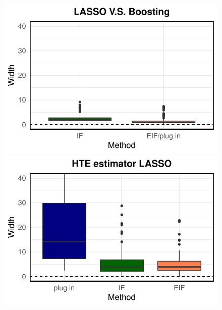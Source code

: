 \begin{figure}[ht]
\begin{minipage}{0.3\textwidth}
                \includegraphics[clip, trim = 0cm 0cm 0cm 0cm, width = \textwidth]{plot/ACIC_linear_propensity_linear_HTE_CI_width_LASSO_V.S._Boosting.pdf}
        \end{minipage}        
        \begin{minipage}{0.3\textwidth}
                \centering
                \includegraphics[clip, trim = 0cm 0cm 0cm 0cm, width = \textwidth]{plot/ACIC_linear_propensity_nonlinear_HTE_CI_width_LASSO.pdf}
        \end{minipage}
        \begin{minipage}{0.3\textwidth}
                \centering

\end{minipage}
\end{figure}
